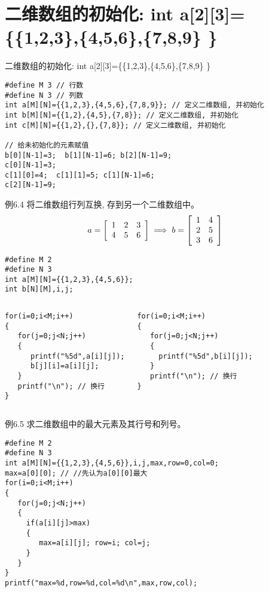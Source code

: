 \section{二维数组的初始化: int a[2][3]=\{\{1,2,3\},\{4,5,6\},\{7,8,9\} \}}

\begin{frame}{二维数组的初始化: int a[2][3]=\{\{1,2,3\},\{4,5,6\},\{7,8,9\} \}}
\begin{lstlisting}
#define M 3 // 行数
#define N 3 // 列数
int a[M][N]={{1,2,3},{4,5,6},{7,8,9}}; // 定义二维数组, 并初始化
int b[M][N]={{1,2},{4,5},{7,8}}; // 定义二维数组, 并初始化
int c[M][N]={{1,2},{},{7,8}}; // 定义二维数组, 并初始化

// 给未初始化的元素赋值
b[0][N-1]=3;  b[1][N-1]=6; b[2][N-1]=9;
c[0][N-1]=3; 
c[1][0]=4;  c[1][1]=5; c[1][N-1]=6; 
c[2][N-1]=9;
\end{lstlisting}
\end{frame}

\begin{frame}{例6.4 将二维数组行列互换, 存到另一个二维数组中。}
\small
\[
a=\left[
\begin{array}[c]{ccc}
1 & 2 & 3\\
4 & 5 & 6
\end{array}
\right]
\implies
b=\left[
\begin{array}[c]{cc}
1 & 4\\
2 & 5\\
3 & 6
\end{array}
\right]
\]
\pause
\begin{lstlisting}
#define M 2 
#define N 3 
int a[M][N]={{1,2,3},{4,5,6}};
int b[N][M],i,j;
\end{lstlisting}
\begin{columns}[T]
\pause
\begin{lstlisting}
for(i=0;i<M;i++) 
{
   for(j=0;j<N;j++) 
   {
      printf("%5d",a[i][j]);
      b[j][i]=a[i][j]; 
   }
   printf("\n"); // 换行
}
\end{lstlisting}
\pause
\begin{lstlisting}
for(i=0;i<M;i++) 
{
   for(j=0;j<N;j++) 
   {
     printf("%5d",b[i][j]); 
   }
   printf("\n"); // 换行
}
\end{lstlisting}
\end{columns}
\vspace{0.001cm}
\end{frame}

\begin{frame}{例6.5 求二维数组中的最大元素及其行号和列号。}
\begin{lstlisting}
#define M 2 
#define N 3 
int a[M][N]={{1,2,3},{4,5,6}},i,j,max,row=0,col=0;
max=a[0][0]; // //先认为a[0][0]最大
for(i=0;i<M;i++) 
{
   for(j=0;j<N;j++) 
   {
     if(a[i][j]>max)
     { 
        max=a[i][j]; row=i; col=j;
     } 
   }
}
printf("max=%d,row=%d,col=%d\n",max,row,col);
\end{lstlisting}
\end{frame}


